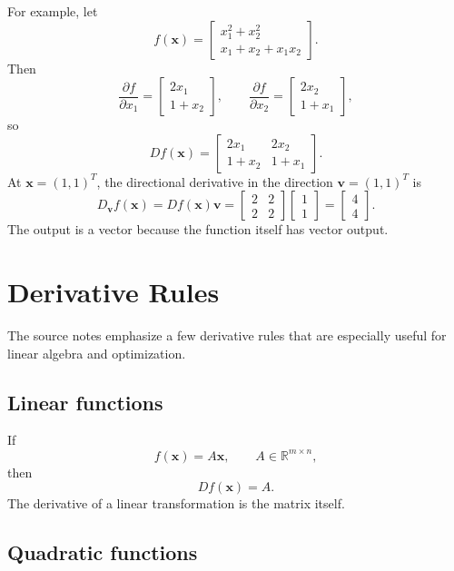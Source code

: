 For example, let
\[
    f(\mathbf{x})=\begin{bmatrix}
        x_1^2+x_2^2\\
        x_1+x_2+x_1x_2
    \end{bmatrix}.
\]
Then
\[
    \frac{\partial f}{\partial x_1}
    =\begin{bmatrix}2x_1\\1+x_2\end{bmatrix},
    \qquad
    \frac{\partial f}{\partial x_2}
    =\begin{bmatrix}2x_2\\1+x_1\end{bmatrix},
\]
so
\[
    Df(\mathbf{x})=\begin{bmatrix}
        2x_1 & 2x_2\\
        1+x_2 & 1+x_1
    \end{bmatrix}.
\]
At \(\mathbf{x}=(1,1)^T\), the directional derivative in the direction \(\mathbf{v}=(1,1)^T\) is
\[
    D_{\mathbf{v}}f(\mathbf{x})
    =Df(\mathbf{x})\mathbf{v}
    =\begin{bmatrix}2&2\\2&2\end{bmatrix}
    \begin{bmatrix}1\\1\end{bmatrix}
    =\begin{bmatrix}4\\4\end{bmatrix}.
\]
The output is a vector because the function itself has vector output.

\section{Derivative Rules}
\label{mf:derivative-rules}

The source notes emphasize a few derivative rules that are especially useful for linear algebra and optimization.

\subsection*{Linear functions}

If
\[
    f(\mathbf{x})=A\mathbf{x},
    \qquad A\in\mathbb{R}^{m\times n},
\]
then
\[
    Df(\mathbf{x})=A.
\]
The derivative of a linear transformation is the matrix itself.

\subsection*{Quadratic functions}

